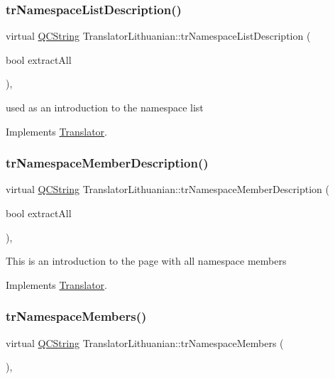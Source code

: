 \subsubsection{\texorpdfstring{trNamespaceListDescription()}{trNamespaceListDescription()}}
{\footnotesize\ttfamily virtual \mbox{\hyperlink{class_q_c_string}{Q\+C\+String}} Translator\+Lithuanian\+::tr\+Namespace\+List\+Description (\begin{DoxyParamCaption}\item[{bool}]{extract\+All }\end{DoxyParamCaption})\hspace{0.3cm}{\ttfamily [inline]}, {\ttfamily [virtual]}}

used as an introduction to the namespace list 

Implements \mbox{\hyperlink{class_translator}{Translator}}.

\mbox{\label{class_translator_lithuanian_ace5e4f996a1d32f1fa115323e2f444f9}} 
\subsubsection{\texorpdfstring{trNamespaceMemberDescription()}{trNamespaceMemberDescription()}}
{\footnotesize\ttfamily virtual \mbox{\hyperlink{class_q_c_string}{Q\+C\+String}} Translator\+Lithuanian\+::tr\+Namespace\+Member\+Description (\begin{DoxyParamCaption}\item[{bool}]{extract\+All }\end{DoxyParamCaption})\hspace{0.3cm}{\ttfamily [inline]}, {\ttfamily [virtual]}}

This is an introduction to the page with all namespace members 

Implements \mbox{\hyperlink{class_translator}{Translator}}.

\mbox{\label{class_translator_lithuanian_acdeeb58f02384b693a756ca571687b24}} 
\subsubsection{\texorpdfstring{trNamespaceMembers()}{trNamespaceMembers()}}
{\footnotesize\ttfamily virtual \mbox{\hyperlink{class_q_c_string}{Q\+C\+String}} Translator\+Lithuanian\+::tr\+Namespace\+Members (\begin{DoxyParamCaption}{ }\end{DoxyParamCaption})\hspace{0.3cm}{\ttfamily [inline]}, {\ttfamily [virtual]}}


